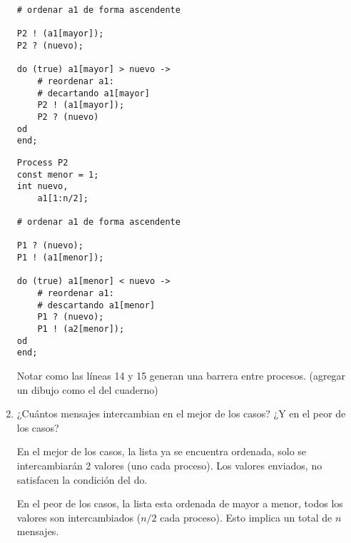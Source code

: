 \documentclass[a4paper, 10pt]{article}
\newenvironment{QandA}{
    \begin{enumerate}\bfseries}
    {\end{enumerate}
}
\newenvironment{answered}{\par\normalfont}{}
\begin{document}
\begin{QandA}
\begin{enumerate}
\begin{answered}
\begin{minipage}[t]{.5\linewidth}
\begin{lstlisting}
# ordenar a1 de forma ascendente

P2 ! (a1[mayor]);
P2 ? (nuevo);

do (true) a1[mayor] > nuevo ->
    # reordenar a1:
    # decartando a1[mayor]
    P2 ! (a1[mayor]);
    P2 ? (nuevo)
od
end;
\end{lstlisting}
\end{minipage}
\begin{minipage}[t]{.5\linewidth}
\begin{lstlisting}
Process P2
const menor = 1;
int nuevo,
    a1[1:n/2];

# ordenar a1 de forma ascendente

P1 ? (nuevo);
P1 ! (a1[menor]);

do (true) a1[menor] < nuevo ->
    # reordenar a1:
    # descartando a1[menor]
    P1 ? (nuevo);
    P1 ! (a2[menor]);
od
end;
\end{lstlisting}
\end{minipage}

Notar como las líneas 14 y 15 generan una barrera entre procesos. (agregar un dibujo como el del cuaderno)
\end{answered}
\item ¿Cuántos mensajes intercambian en el mejor de los casos? ¿Y en el peor de los casos?
\begin{answered}
En el mejor de los casos, la lista ya se encuentra ordenada, solo se intercambiarán 2 valores (uno cada proceso). Los valores enviados, no satisfacen la condición del do.

En el peor de los casos, la lista esta ordenada de mayor a menor, todos los valores son intercambiados ($n/2$ cada proceso). Esto implica un total de $n$ mensajes.
\end{answered}
\end{enumerate}


\end{QandA}
\end{document}
